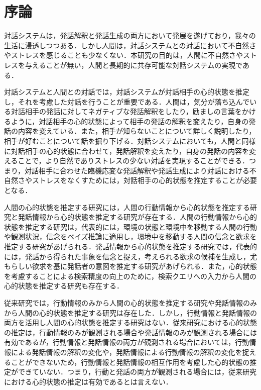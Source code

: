 \chapter{序論}

\par
対話システムは，発話解釈と発話生成の両方において発展を遂げており，我々の生活に浸透しつつある．しかし人間は，対話システムとの対話において不自然さやストレスを感じることも少なくない．本研究の目的は，人間に不自然さやストレスを与えることが無い，人間と長期的に共存可能な対話システムの実現である．

\par
対話システムと人間との対話では，対話システムが対話相手の心的状態を推定し，それを考慮した対話を行うことが重要である．人間は，気分が落ち込んでいる対話相手の発話に対してネガティブな発話解釈をしたり，励ましの言葉をかけるように，対話相手の心的状態によって相手の発話の解釈を変えたり，自身の発話の内容を変えている．また，相手が知らないことについて詳しく説明したり，相手が好むことについて話を掘り下げる．対話システムにおいても，人間と同様に対話相手の心的状態に合わせて，発話解釈を変えたり，自身の発話の内容を変えることで，より自然でありストレスの少ない対話を実現することができる．つまり，対話相手に合わせた臨機応変な発話解釈や発話生成により対話における不自然さやストレスをなくすためには，対話相手の心的状態を推定することが必要となる．

\par
人間の心的状態を推定する研究には，人間の行動情報から心的状態を推定する研究と発話情報から心的状態を推定する研究が存在する．人間の行動情報から心的状態を推定する研究は，代表的には，環境の状態と環境中を移動する人間の行動や観測状況，信念をベイズ推論に適用し，環境中を移動する人間の信念と欲求を推定する研究\cite{baker2011bayesian}があげられる．発話情報から心的状態を推定する研究では，代表的には，発話から得られた事象を信念と捉え，考えられる欲求の候補を生成し，尤もらしい欲求を基に発話者の意図を推定する研究\cite{高橋拓誠2015bdi}があげられる．また，心的状態を考慮することによる検索精度の向上のために，検索クエリへの入力から人間の心的状態を推定する研究\cite{10.1007/978-3-642-02481-8_4}も存在する．

\par
従来研究では，行動情報のみから人間の心的状態を推定する研究や発話情報のみから人間の心的状態を推定する研究は存在した．しかし，行動情報と発話情報の両方を活用し人間の心的状態を推定する研究はない．従来研究における心的状態の推定は，行動情報のみが観測される場合や発話情報のみが観測される場合には有効であるが，行動情報と発話情報の両方が観測される場合においては，行動情報による発話情報の解釈の変化や，発話情報による行動情報の解釈の変化を捉えることができないため，行動情報と発話情報の相互作用を考慮した心的状態の推定ができていない．つまり，行動と発話の両方が観測される場合には，従来研究における心的状態の推定は有効であるとは言えない．

